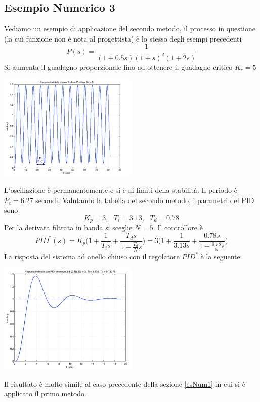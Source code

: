 \documentclass[10pt, letterpaper]{report}
\begin{document}
\subsection{Esempio Numerico 3}
Vediamo un esempio di applicazione del secondo metodo, il processo in questione (la cui funzione non è nota al progettista) è lo stesso degli esempi precedenti 
$$P(s)=\frac{1}{(1+0.5s)(1+s)^2(1+2s)}$$
Si aumenta il guadagno proporzionale fino ad ottenere il guadagno critico $K_c=5$
\begin{center}
    \includegraphics[width=0.5\textwidth]{images/2ZN2.png}
\end{center}
L'oscillazione è permanentemente e si è ai limiti della stabilità. Il periodo è $P_c=6.27$ secondi. Valutando la tabella del secondo metodo, i parametri del PID sono 
$$K_p=3,\ \ \ T_i=3.13, \ \ \ T_d=0.78 $$
Per la derivata filtrata in banda si sceglie $N=5$. Il controllore è 
$$ PID^*(s)=
K_p\Big(1+\frac{1}{T_i s}+\dfrac{T_d s}{1+\frac{T_d}{N}s}\Big)= 
3\Big(1+\frac{1}{3.13 s}+\dfrac{0.78 s}{1+\frac{0.78}{5}s}\Big)
$$
La risposta del sistema ad anello chiuso con il regolatore $PID^*$ è la seguente 
\begin{center}
    \includegraphics[width=0.5\textwidth]{images/2ZN3.png}
\end{center}
Il risultato è molto simile al caso precedente della sezione \ref{esNum1} in cui si è applicato il primo metodo.
\flowerLine
\end{document}
